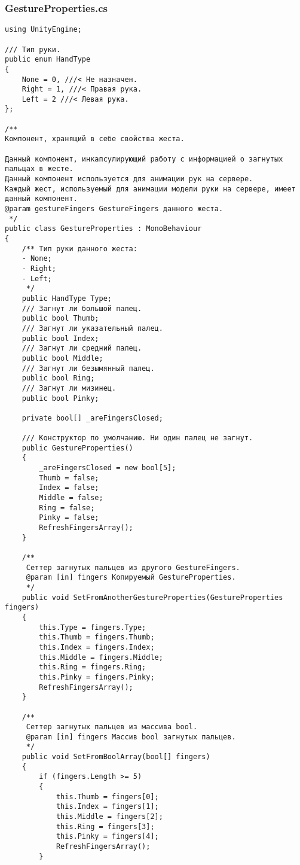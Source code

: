 \subsubsection*{GestureProperties.cs}
\begin{verbatim}
﻿using UnityEngine;

/// Тип руки.
public enum HandType
{
    None = 0, ///< Не назначен.
    Right = 1, ///< Правая рука.
    Left = 2 ///< Левая рука.
};

/**
Компонент, хранящий в себе свойства жеста.

Данный компонент, инкапсулирующий работу с информацией о загнутых пальцах в жесте.
Данный компонент используется для анимации рук на сервере. 
Каждый жест, используемый для анимации модели руки на сервере, имеет данный компонент.
@param gestureFingers GestureFingers данного жеста.
 */
public class GestureProperties : MonoBehaviour
{
    /** Тип руки данного жеста:
    - None;
    - Right;
    - Left;
     */
    public HandType Type;
    /// Загнут ли большой палец.
    public bool Thumb;
    /// Загнут ли указательный палец.
    public bool Index;
    /// Загнут ли средний палец.
    public bool Middle;
    /// Загнут ли безымянный палец.
    public bool Ring;
    /// Загнут ли мизинец.
    public bool Pinky;

    private bool[] _areFingersClosed;

    /// Конструктор по умолчанию. Ни один палец не загнут.
    public GestureProperties()
    {
        _areFingersClosed = new bool[5];
        Thumb = false;
        Index = false;
        Middle = false;
        Ring = false;
        Pinky = false;
        RefreshFingersArray();
    }

    /** 
     Сеттер загнутых пальцев из другого GestureFingers.
     @param [in] fingers Копируемый GestureProperties.
     */
    public void SetFromAnotherGestureProperties(GestureProperties fingers)
    {
        this.Type = fingers.Type;
        this.Thumb = fingers.Thumb;
        this.Index = fingers.Index;
        this.Middle = fingers.Middle;
        this.Ring = fingers.Ring;
        this.Pinky = fingers.Pinky;
        RefreshFingersArray();
    }

    /** 
     Сеттер загнутых пальцев из массива bool.
     @param [in] fingers Массив bool загнутых пальцев.
     */
    public void SetFromBoolArray(bool[] fingers)
    {
        if (fingers.Length >= 5)
        {
            this.Thumb = fingers[0];
            this.Index = fingers[1];
            this.Middle = fingers[2];
            this.Ring = fingers[3];
            this.Pinky = fingers[4];
            RefreshFingersArray();
        }


\end{verbatim}

